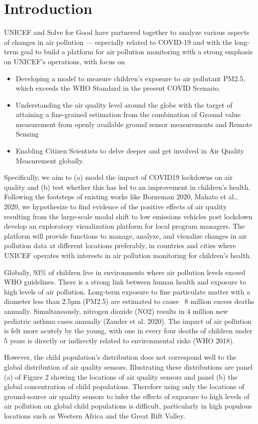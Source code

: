 \section{Introduction}\label{sec:intro}
UNICEF and Solve for Good have partnered together to analyze various aspects of changes in air pollution — especially related to COVID-19 and with the long-term goal to build a platform for air pollution monitoring with a strong emphasis on UNICEF’s operations, with focus on
\begin{itemize}
    \item Developing a model to measure children’s exposure to air pollutant PM2.5, which exceeds the WHO Standard in the present COVID Scenario.
    \item Understanding the air quality level around the globe with the target of attaining a fine-grained estimation from the combination of Ground value measurement from openly available ground sensor measurements and Remote Sensing
    \item Enabling Citizen Scientists to delve deeper and get involved in Air Quality Measurement globally.
\end{itemize} 
%
Specifically, we aim to (a) model the impact of COVID19 lockdowns on air quality and (b) test whether this has led to an improvement in children’s health. Following the footsteps of existing works like Borneman 2020, Mahato et al., 2020, we hypothesize to find evidence of the positive effects of air quality resulting from the large-scale modal shift to low emissions vehicles post lockdown develop an exploratory visualization platform for local program managers. The platform will provide functions to manage, analyze, and visualize changes in air pollution data at different locations preferably, in countries and cities where UNICEF operates with interests in air pollution monitoring for children’s health.

Globally, 93\% of children live in environments where air pollution levels exceed WHO guidelines. There is a strong link between human health and exposure to high levels of air pollution. Long-term exposure to fine particulate matter with a diameter less than 2.5µm (PM2.5) are estimated to cause ~8 million excess deaths annually. Simultaneously, nitrogen dioxide (NO2) results in 4 million new pediatric asthma cases annually (Zander et al. 2020). The impact of air pollution is felt more acutely by the young, with one in every four deaths of children under 5 years is directly or indirectly related to environmental risks (WHO 2018).

However, the child population’s distribution does not correspond well to the global distribution of air quality sensors. Illustrating these distributions are panel (a) of Figure 2 showing the locations of air quality sensors and panel (b) the global concentration of child populations. Therefore using only the locations of ground-source air quality sensors to infer the effects of exposure to high levels of air pollution on global child populations is difficult, particularly in high populous locations such as Western Africa and the Great Rift Valley.